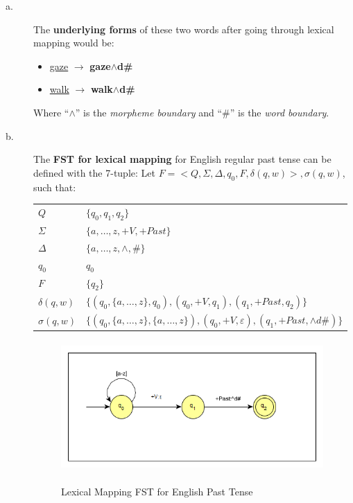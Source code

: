 \documentclass[11pt]{article}
\begin{document}
\begin{solution}
\begin{description}
	\item[a.] The \textbf{underlying forms} of these two words after going through lexical mapping would be:
		\begin{itemize}
			\item \underline{gaze} $\rightarrow$ \textbf{gaze$\wedge$d\#}
			\item \underline{walk} $\rightarrow$ \textbf{walk$\wedge$d\#}
		\end{itemize}
		Where ``$\wedge$'' is the \textit{morpheme boundary} and ``\#'' is the \textit{word boundary}.

	\item[b.] The \textbf{FST for lexical mapping} for English regular past tense can be defined with the 7-tuple:
	Let $F = <Q, \Sigma, \Delta, q_{0}, F, \delta(q, w)>, \sigma(q, w)$, such that:

	\begin{tabular}{l | l}
		$Q$ & $\{ q_{0}, q_{1}, q_{2}\}$ \\
		$\Sigma$ & $\{a, \ldots, z, +V, +Past\}$ \\
		$\Delta$ & $\{a, \ldots, z, \wedge, \# \}$ \\
		$q_{0}$ & $q_{0}$ \\
		$F$ & $\{ q_{2} \}$ \\
		$\delta(q, w)$ &  $\{ (q_{0},\{a, \ldots, z\},q_{0}), (q_{0}, +V, q_{1}), (q_{1}, +Past, q_{2}) \}$ \\
		$\sigma(q, w)$ & $\{ (q_{0},\{a, \ldots, z\},\{a, \ldots, z\}), (q_{0}, +V, \varepsilon), (q_{1}, +Past, \wedge d\#) \}$
	\end{tabular}

	\begin{figure}[h]
		\centering
		\includegraphics[width=10cm, height=5cm]{problem07partb} \\
		\caption{Lexical Mapping FST for English Past Tense}
	\end{figure}


\end{description}
\end{solution}
\end{document}
